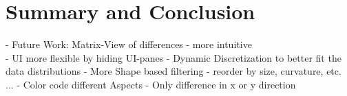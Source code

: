 \documentclass[journal]{style/vgtc} 			          %
\begin{document}
% 


\section{Summary and Conclusion}
- Future Work: Matrix-View of differences - more intuitive\\
- UI more flexible by hiding UI-panes
- Dynamic Discretization to better fit the data distributions
- More Shape based filtering - reorder by size, curvature, etc. ...
- Color code different Aspects - Only difference in x or y direction
\end{document}
